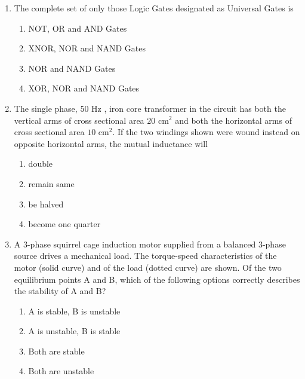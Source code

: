 \documentclass[journal,9pt,onecolumn]{IEEEtran}
\begin{document}
\begin{enumerate}


\item The complete set of only those Logic Gates designated as Universal Gates is
\begin{multicols}{2}
\begin{enumerate}
     \item NOT, OR and AND Gates
    \item XNOR, NOR and NAND Gates
    \item NOR and NAND Gates
    \item XOR, NOR and NAND Gates
\end{enumerate}
\end{multicols}

\item The single phase, 50 Hz , iron core transformer in the circuit has both the vertical arms of cross sectional area $20$ cm$^{2}$ and both the horizontal arms of cross sectional area $10$ cm$^{2}$. If the two windings shown were wound instead on opposite horizontal arms, the mutual inductance will
\begin{center}
    
\end{center}
\begin{multicols}{4}
\begin{enumerate}
     \item double
    \item remain same
    \item be halved
    \item become one quarter
\end{enumerate}
\end{multicols}


\item A 3-phase squirrel cage induction motor supplied from a balanced 3-phase source drives a mechanical load. The torque-speed characteristics of the motor (solid curve) and of the load (dotted curve) are shown. Of the two equilibrium points A and B, which of the following options correctly describes the stability of A and B?
\begin{center}
    
\end{center}
\begin{multicols}{2}
    \begin{enumerate}
    \item A is stable, B is unstable
    \item A is unstable, B is stable
    \item Both are stable
    \item Both are unstable
    \end{enumerate}
\end{multicols}



\end{enumerate}
\end{document}
